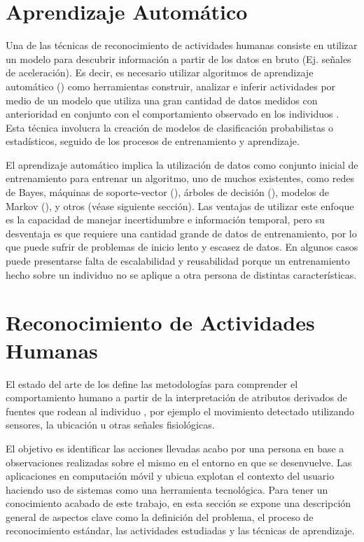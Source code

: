 \section{Aprendizaje Automático}

\label{sec25:aprendizaje-automatico}Una de las técnicas de reconocimiento
de actividades humanas consiste en utilizar un modelo para descubrir
información a partir de los datos en bruto (Ej. señales de aceleración).
Es decir, es necesario utilizar algoritmos de aprendizaje automático
() como herramientas construir, analizar e inferir actividades
por medio de un modelo que utiliza una gran cantidad de datos medidos
con anterioridad en conjunto con el comportamiento observado en los
individuos \cite{Chen2012}. Esta técnica involucra la creación de
modelos de clasificación probabilistas o estadísticos, seguido de
los procesos de entrenamiento y aprendizaje.

El aprendizaje automático implica la utilización de datos como conjunto
inicial de entrenamiento para entrenar un algoritmo, uno de muchos
existentes, como redes de Bayes, máquinas de soporte-vector (),
árboles de decisión (), modelos de Markov (),
y otros \cite{Rajaraman2011} (véase siguiente sección). Las ventajas
de utilizar este enfoque es la capacidad de manejar incertidumbre
e información temporal, pero su desventaja es que requiere una cantidad
grande de datos de entrenamiento, por lo que puede sufrir de problemas
de inicio lento y escasez de datos. En algunos casos puede presentarse
falta de escalabilidad y reusabilidad porque un entrenamiento hecho
sobre un individuo no se aplique a otra persona de distintas características.

\section{Reconocimiento de Actividades Humanas}

El estado del arte de los define las metodologías para
comprender el comportamiento humano a partir de la interpretación
de atributos derivados de fuentes que rodean al individuo \cite{Bao2004,Poppe2007},
por ejemplo el movimiento detectado utilizando sensores, la ubicación
u otras señales fisiológicas. 

El objetivo es identificar las acciones llevadas acabo por una persona
en base a observaciones realizadas sobre el mismo en el entorno en
que se desenvuelve. Las aplicaciones en computación móvil y ubicua
explotan el contexto del usuario haciendo uso de sistemas 
como una herramienta tecnológica. Para tener un conocimiento acabado
de este trabajo, en esta sección se expone una descripción general
de aspectos clave como la definición del problema, el proceso de reconocimiento
estándar, las actividades estudiadas y las técnicas de aprendizaje.

